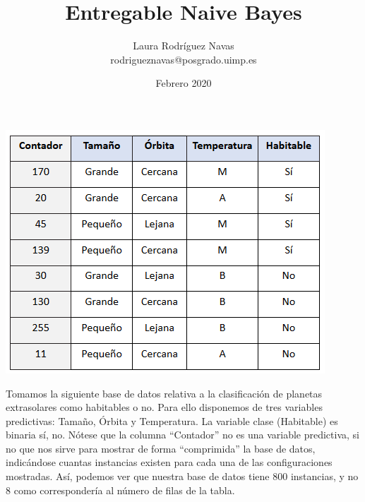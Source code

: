\documentclass[11pt]{exam}
\title{Entregable Naive Bayes}
\author{Laura Rodríguez Navas \\ rodrigueznavas@posgrado.uimp.es}
\date{Febrero 2020}
\begin{document}
\maketitle

\begin{center}
	\includegraphics[scale=0.9]{img.png}
\end{center}

Tomamos la siguiente base de datos relativa a la clasificación de planetas extrasolares como habitables o no. Para ello disponemos de tres variables predictivas: Tamaño, Órbita y Temperatura. La variable clase (Habitable) es binaria {sí, no}. Nótese que la columna “Contador” no es una variable predictiva, si no que nos sirve para mostrar de forma “comprimida” la base de datos, indicándose cuantas instancias existen para cada una de las configuraciones mostradas. Así, podemos ver que nuestra base de datos tiene 800 instancias, y no 8 como correspondería al número de filas de la tabla.
\end{document}

